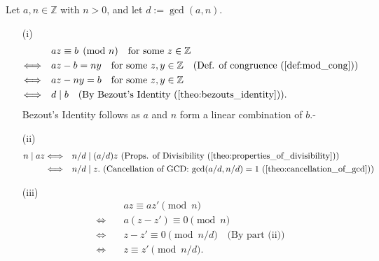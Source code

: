 \begin{Proof}
    Let \(a, n \in \mathbb{Z}\) with \(n > 0\), and let \(d := \gcd(a, n)\).
   \begin{itemize}
    \item [(i)] 
    \begin{align*}
        &az \equiv b \pmod{n} \quad \text{for some } z \in \mathbb{Z} \\
        \Longleftrightarrow \quad &az - b = ny \quad \text{for some } z, y \in \mathbb{Z} \quad \text{(Def. of congruence (\ref{def:mod_cong}))} \\
        \Longleftrightarrow \quad &az - ny = b \quad \text{for some } z, y \in \mathbb{Z} \\
        \Longleftrightarrow \quad &d \mid b \quad \text{(By Bezout's Identity (\ref{theo:bezouts_identity}))}.
        \end{align*}
        Bezout's Identity follows as $a$ and $n$ form a linear combination of $b$.-
    \item [(ii)] 
    \begin{align*}
        n \mid az \Longleftrightarrow \quad & n/d \mid (a/d)z  \text{ (Props. of Divisibility (\ref{theo:properties_of_divisibility}))}\\
        \Longleftrightarrow \quad & n/d \mid z.  \text{ (Cancellation of GCD: $\gcd(a/d,n/d)=1$ (\ref{theo:cancellation_of_gcd}))}
    \end{align*}


    \item [(iii)]
    \begin{align*}
        &az \equiv az' \pmod{n} \\
        \Longleftrightarrow \quad & a(z - z') \equiv 0 \pmod{n} \\
        \Longleftrightarrow \quad & z - z' \equiv 0 \pmod{n/d} \quad \text{(By part (ii))} \\
        \Longleftrightarrow \quad & z \equiv z' \pmod{n/d}.
        \end{align*}
        

   \end{itemize}
\end{Proof}








